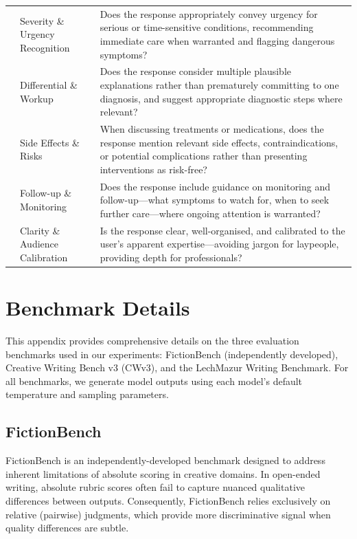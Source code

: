 \documentclass{article}
\theoremstyle{plain}
\theoremstyle{definition}
\theoremstyle{remark}
\begin{document}
\begin{table}[h]
\begin{tabular}{clp{11cm}}
\addlinespace
400 & Severity \& Urgency Recognition & Does the response appropriately convey urgency for serious or time-sensitive conditions, recommending immediate care when warranted and flagging dangerous symptoms? \\
\addlinespace
450 & Differential \& Workup & Does the response consider multiple plausible explanations rather than prematurely committing to one diagnosis, and suggest appropriate diagnostic steps where relevant? \\
\addlinespace
500 & Side Effects \& Risks & When discussing treatments or medications, does the response mention relevant side effects, contraindications, or potential complications rather than presenting interventions as risk-free? \\
\addlinespace
550 & Follow-up \& Monitoring & Does the response include guidance on monitoring and follow-up---what symptoms to watch for, when to seek further care---where ongoing attention is warranted? \\
\addlinespace
600 & Clarity \& Audience Calibration & Is the response clear, well-organised, and calibrated to the user's apparent expertise---avoiding jargon for laypeople, providing depth for professionals? \\
\bottomrule
\end{tabular}
\label{tab:healthbench-rubric-criteria}
\end{table}

\section{Benchmark Details}
\label{app:benchmark-details}

This appendix provides comprehensive details on the three evaluation benchmarks used in our experiments: FictionBench (independently developed), Creative Writing Bench v3 (CWv3), and the LechMazur Writing Benchmark. For all benchmarks, we generate model outputs using each model's default temperature and sampling parameters.

\subsection{FictionBench}
\label{app:fictionbench}

FictionBench is an independently-developed benchmark designed to address inherent limitations of absolute scoring in creative domains. In open-ended writing, absolute rubric scores often fail to capture nuanced qualitative differences between outputs. Consequently, FictionBench relies exclusively on relative (pairwise) judgments, which provide more discriminative signal when quality differences are subtle.
\end{document}
